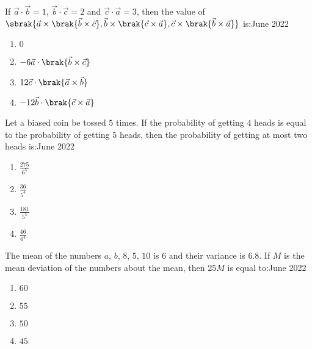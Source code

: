 \iffalse
   \title{Assignment}
   \author{EE24BTECH11034}
   \section{mcq-single}
\fi 

   \item If $\vec{a}\cdot\vec{b}=1$, $\vec{b}\cdot\vec{c}=2$ and $\vec{c}\cdot\vec{a}=3$, then the value of $\sbrak{\vec{a}\times\brak{\vec{b}\times\vec{c}}, \vec{b}\times\brak{\vec{c}\times\vec{a}}, \vec{c}\times\brak{\vec{b}\times\vec{a}}}$ is:\hfill{June 2022}

        \begin{multicols}{4}
        \begin{enumerate}
        \item $0$
        \item $-6\vec{a}\cdot\brak{\vec{b}\times\vec{c}}$
        \item $12\vec{c}\cdot\brak{\vec{a}\times\vec{b}}$
        \item $-12\vec{b}\cdot\brak{\vec{c}\times\vec{a}}$
        \end{enumerate}
        \end{multicols} 

    \item Let a biased coin be tossed $5$ times. If the probability of getting $4$ heads is equal to the probability of getting $5$ heads, then the probability of getting at most two heads is:\hfill{June 2022}
        
        \begin{multicols}{4}
        \begin{enumerate}
        \item $\frac{275}{6^{5}}$
        \item $\frac{36}{5^{4}}$
        \item $\frac{181}{5^{5}}$
        \item $\frac{46}{6^{4}}$
        \end{enumerate}
        \end{multicols}
        
    
    \item The mean of the numbers $a$, $b$, $8$, $5$, $10$ is $6$ and their variance is $6.8$. If $M$ is the mean deviation of the numbers about the mean, then $25M$ is equal to:\hfill{June 2022}

        \begin{multicols}{4}
        \begin{enumerate}
        \item $60$
        \item $55$
        \item $50$
        \item $45$
        \end{enumerate}
        \end{multicols}

